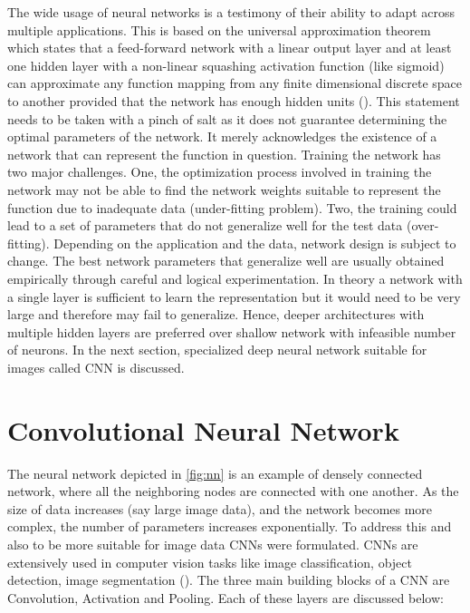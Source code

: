 The wide usage of neural networks is a testimony of their ability to adapt across multiple applications. This is based on the universal approximation theorem which states that a feed-forward network with a linear output layer and at least one hidden layer with a non-linear squashing activation function (like sigmoid) can approximate any function mapping from any finite dimensional discrete space to another provided that the network has enough hidden units (\cite{hornik1990universal}). This statement needs to be taken with a pinch of salt as it does not guarantee determining the optimal parameters of the network. It merely acknowledges the existence of a network that can represent the function in question. Training the network has two major challenges. One, the optimization process involved in training the network may not be able to find the network weights suitable to represent the function due to inadequate data (under-fitting problem). Two, the training could lead to a set of parameters that do not generalize well for the test data (over-fitting). Depending on the application and the data, network design is subject to change. The best network parameters that generalize well are usually obtained empirically through careful and logical experimentation. In theory a network with a single layer is sufficient to learn the representation but it would need to be very large and therefore may fail to generalize. Hence, deeper architectures with multiple hidden layers are preferred over shallow network with infeasible number of neurons. In the next section, specialized deep neural network suitable for images called \acf{CNN} is discussed. 

\section{Convolutional Neural Network}

The neural network depicted in \ref{fig:nn} is an example of densely connected network, where all the neighboring nodes are connected with one another. As the size of data increases (say large image data), and the network becomes more complex, the number of parameters increases exponentially. To address this and also to be more suitable for image data \ac{CNN}s were formulated. \ac{CNN}s are extensively used in computer vision tasks like image classification, object detection, image segmentation (\cite{voulodimos2018deep}). The three main building blocks of a \ac{CNN} are Convolution, Activation and Pooling. Each of these layers are discussed below:

